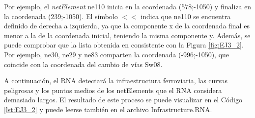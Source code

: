	Por ejemplo, el \textit{netElement} ne110 inicia en la coordenada (578;-1050) y finaliza en la coordenada (239;-1050). El símbolo $<<$ indica que ne110 se encuentra definido de derecha a izquierda, ya que la componente x de la coordenada final es menor a la de la coordenada inicial, teniendo la misma componente y. Además, se puede comprobar que la lista obtenida en consistente con la Figura \ref{fig:EJ3_2}. Por ejemplo, ne30, ne29 y ne83 comparten la coordenada (-996;-1050), que coincide con la coordenada del cambio de vías Sw08.
	
	A continuación, el RNA detectará la infraestructura ferroviaria, las curvas peligrosas y los puntos medios de los netElements que el RNA considera demasiado largos. El resultado de este proceso se puede visualizar en el Código \ref{lst:EJ3_2} y puede leerse también en el archivo Infrastructure.RNA.
	
